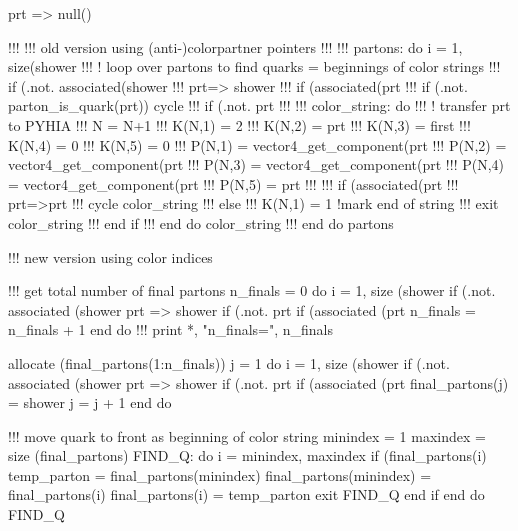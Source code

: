     prt => null()

    !!! !!! old version using (anti-)colorpartner pointers
    !!!
    !!!      partons: do i = 1, size(shower%
    !!!         ! loop over partons to find quarks = beginnings of color strings
    !!!         if (.not. associated(shower%
    !!!         prt=> shower%
    !!!         if (associated(prt%
    !!!         if (.not. parton_is_quark(prt)) cycle
    !!!         if (.not. prt%
    !!!
    !!!         color_string: do
    !!!            ! transfer prt to PYHIA
    !!!            N = N+1
    !!!            K(N,1) = 2
    !!!            K(N,2) = prt%
    !!!            K(N,3) = first
    !!!            K(N,4) = 0
    !!!            K(N,5) = 0
    !!!            P(N,1) = vector4_get_component(prt%
    !!!            P(N,2) = vector4_get_component(prt%
    !!!            P(N,3) = vector4_get_component(prt%
    !!!            P(N,4) = vector4_get_component(prt%
    !!!            P(N,5) = prt%
    !!!
    !!!            if (associated(prt%
    !!!               prt=>prt%
    !!!               cycle color_string
    !!!            else
    !!!               K(N,1) = 1 !mark end of string
    !!!               exit color_string
    !!!            end if
    !!!         end do color_string
    !!!      end do partons

    !!! new version using color indices

    !!! get total number of final partons
    n_finals = 0
    do i = 1, size (shower%
       if (.not. associated (shower%
       prt => shower%
       if (.not. prt%
       if (associated (prt%
       n_finals = n_finals + 1
    end do
    !!! print *, "n_finals=", n_finals

    allocate (final_partons(1:n_finals))
    j = 1
    do i = 1, size (shower%
       if (.not. associated (shower%
       prt => shower%
       if (.not. prt%
       if (associated (prt%
       final_partons(j) = shower%
       j = j + 1
    end do

    !!! move quark to front as beginning of color string
    minindex = 1
    maxindex = size (final_partons)
    FIND_Q: do i = minindex, maxindex
       if (final_partons(i)%
          temp_parton = final_partons(minindex)
          final_partons(minindex) = final_partons(i)
          final_partons(i) = temp_parton
          exit FIND_Q
       end if
    end do FIND_Q

